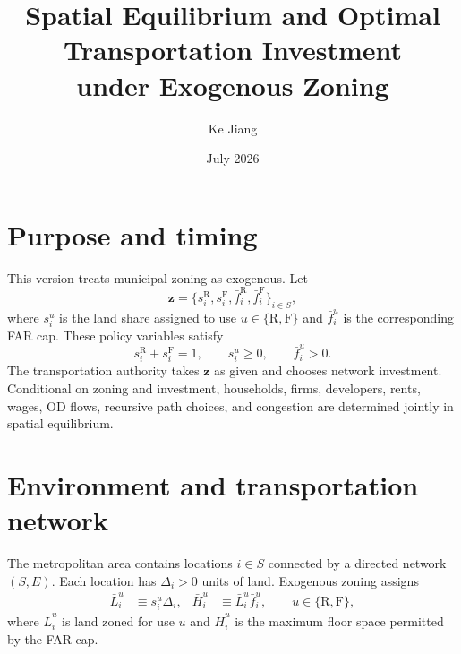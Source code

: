 \documentclass[12pt,a4paper]{article}
\title{Spatial Equilibrium and Optimal Transportation Investment\\under Exogenous Zoning}
\author{Ke Jiang}
\date{July 2026}
\newcommand{\R}{\mathrm{R}}
\newcommand{\F}{\mathrm{F}}
\newcommand{\1}{\mathbb 1}
\begin{document}
\maketitle

\section{Purpose and timing}

This version treats municipal zoning as exogenous. Let
\[
\mathbf z
=
\{s_i^{\R},s_i^{\F},\bar f_i^{\R},\bar f_i^{\F}\}_{i\in S},
\]
where $s_i^u$ is the land share assigned to use $u\in\{\R,\F\}$ and $\bar f_i^u$ is the corresponding FAR cap. These policy variables satisfy
\[
s_i^{\R}+s_i^{\F}=1,
\qquad
s_i^u\geq 0,
\qquad
\bar f_i^u>0.
\]
The transportation authority takes $\mathbf z$ as given and chooses network investment. Conditional on zoning and investment, households, firms, developers, rents, wages, OD flows, recursive path choices, and congestion are determined jointly in spatial equilibrium.

\section{Environment and transportation network}

The metropolitan area contains locations $i\in S$ connected by a directed network $(S,E)$. Each location has $\Delta_i>0$ units of land. Exogenous zoning assigns
\begin{align}
\bar L_i^u&\equiv s_i^u\Delta_i,
&
\bar H_i^u&\equiv \bar L_i^u\bar f_i^u,
\qquad u\in\{\R,\F\},
\label{eq:zoning-primitives}
\end{align}
where $\bar L_i^u$ is land zoned for use $u$ and $\bar H_i^u$ is the maximum floor space permitted by the FAR cap.
\end{document}
